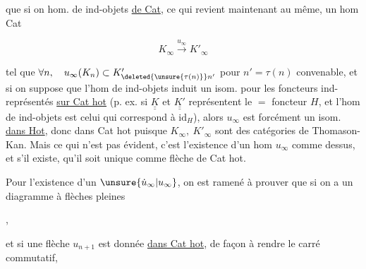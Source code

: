 
que si on  hom. de ind-objets \uline{de Cat},  ce qui revient maintenant au même, un hom  Cat

\[
K_\infty \xrightarrow{u_\infty} K'_\infty
\]

tel que $\forall n,\quad u_\infty(K_n)\subset K'_{\deleted{\unsure{\tau(n)}}n'}$ pour $n'=\tau(n)$ convenable,  et si on suppose que l'hom de ind-objets induit un isom. pour les foncteurs ind-représentés \uline{sur Cat hot} (p. ex. si $\underline{\underline K}$ et $\underline{\underline {K'}}$ représentent le $=$ foncteur $H$, et l'hom de ind-objets est celui qui correspond à $\mathrm{id}_H$), alors $u_\infty$ est forcément un isom. \uline{dans Hot}, donc   dans Cat hot puisque $K_\infty,\ K'_\infty$ sont des catégories de Thomason-Kan. Mais ce qui n'est pas évident, c'est l'existence d'un hom $u_\infty$ comme dessus, et s'il existe, qu'il soit unique  comme flèche de Cat hot.

Pour l'existence d'un $\unsure{\dot u_\infty|u_\infty}$, on est ramené à prouver que si on a un diagramme à flèches pleines

,

et si une flèche $u_{n+1}$ est donnée  \uline{dans Cat hot}, de façon à rendre le carré commutatif,

